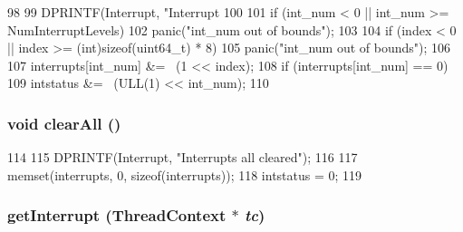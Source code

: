 \begin{DoxyCode}
98     {
99         DPRINTF(Interrupt, "Interrupt %
100 
101         if (int_num < 0 || int_num >= NumInterruptLevels)
102             panic("int_num out of bounds\n");
103 
104         if (index < 0 || index >= (int)sizeof(uint64_t) * 8)
105             panic("int_num out of bounds\n");
106 
107         interrupts[int_num] &= ~(1 << index);
108         if (interrupts[int_num] == 0)
109             intstatus &= ~(ULL(1) << int_num);
110     }
\end{DoxyCode}
\hypertarget{classAlphaISA_1_1Interrupts_a798729dca95209ecdc609807a653a2bf}{
\subsubsection[{clearAll}]{\setlength{\rightskip}{0pt plus 5cm}void clearAll ()}}
\label{classAlphaISA_1_1Interrupts_a798729dca95209ecdc609807a653a2bf}



\begin{DoxyCode}
114     {
115         DPRINTF(Interrupt, "Interrupts all cleared\n");
116 
117         memset(interrupts, 0, sizeof(interrupts));
118         intstatus = 0;
119     }
\end{DoxyCode}
\hypertarget{classAlphaISA_1_1Interrupts_ae603c88d759977611d3bcc6e2deb61ae}{
\subsubsection[{getInterrupt}]{ getInterrupt ({\bf ThreadContext} $\ast$ {\em tc})}}
\label{classAlphaISA_1_1Interrupts_ae603c88d759977611d3bcc6e2deb61ae}



